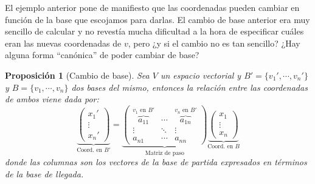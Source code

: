 \documentclass[10pt,a4paper,openright]{book}
\theoremstyle{break}
\newtheorem*{prop}{Proposición}
\begin{document}
El ejemplo anterior pone de manifiesto que las coordenadas pueden cambiar en función de la base que escojamos para darlas. El cambio de base anterior era muy sencillo de calcular y no revestía mucha dificultad a la hora de especificar cuáles eran las nuevas coordenadas de $v$, pero ¿y si el cambio no es tan sencillo? ¿Hay alguna forma ``canónica'' de poder cambiar de base?

\begin{prop}[Cambio de base]
Sea $V$ un espacio vectorial y $B'=\{v_1',\cdots, v_n'\}$ y $B=\{v_1, \cdots, v_n\}$ dos bases del mismo, entonces la relación entre las coordenadas de ambos viene dada por:
$$
\underbrace{\left(\begin{array}{c} x_1'\\\vdots\\x_n'\end{array} \right)}_{\mbox{Coord. en } B'}=\underbrace{\left(\begin{array}{ccc}\overbrace{a_{11}}^{v_1\mbox{ en }B'}&\cdots&\overbrace{a_{1n}}^{v_n\mbox{ en }B'}\\\vdots&\ddots&\vdots\\a_{n1}&\cdots&a_{nn}\end{array}\right)}_{\mbox{Matriz de paso}}\underbrace{\left(\begin{array}{c}x_1\\\vdots\\x_n\end{array}\right)}_{\mbox{Coord. en } B}
$$
donde las columnas son los vectores de la base de partida expresados en términos de la base de llegada.
\end{prop}
\end{document}

